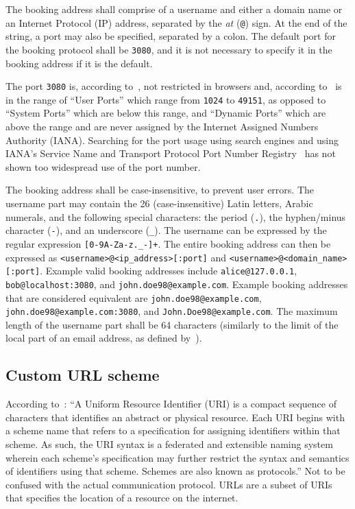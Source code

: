 The booking address shall comprise of a username and either a domain name or an Internet Protocol (IP) address, separated by the \textit{at} (\texttt{@}) sign. At the end of the string, a port may also be specified, separated by a colon. The default port for the booking protocol shall be \texttt{3080}, and it is not necessary to specify it in the booking address if it is the default.

The port \texttt{3080} is, according to~\cite{neo4j_ports}, not restricted in browsers and, according to~\cite{rfc6335} is in the range of \enquote{User Ports} which range from \texttt{1024} to \texttt{49151}, as opposed to \enquote{System Ports} which are below this range, and \enquote{Dynamic Ports} which are above the range and are never assigned by the Internet Assigned Numbers Authority (IANA). Searching for the port usage using search engines and using IANA's Service Name and Transport Protocol Port Number Registry~\cite{iana_ports} has not shown too widespread use of the port number.

\begin{sloppypar}
The booking address shall be case-insensitive, to prevent user errors. The username part may contain the 26 (case-insensitive) Latin letters, Arabic numerals, and the following special characters: the period (\texttt{.}), the hyphen/minus character (\texttt{-}), and an underscore (\texttt{_}). The username can be expressed by the regular expression \texttt{[0-9A-Za-z._-]+}. The entire booking address can then be expressed as \texttt{<username>@<ip_address>[:port]} and \texttt{<username>@<domain_name>[:port]}. Example valid booking addresses include \texttt{alice@127.0.0.1}, \texttt{bob@localhost:3080}, and \texttt{john.doe98@example.com}. Example booking addresses that are considered equivalent are \texttt{john.doe98@example.com}, \texttt{john.doe98@example.com:3080}, and \texttt{John.Doe98@example.com}. The maximum length of the username part shall be 64 characters (similarly to the limit of the local part of an email address, as defined by~\cite{rfc5321}).
\end{sloppypar}

\subsection{Custom URL scheme}

According to~\cite{google_pwa_uri}: \enquote{A Uniform Resource Identifier (URI) is a compact sequence of characters that identifies an abstract or physical resource. Each URI begins with a scheme name that refers to a specification for assigning identifiers within that scheme. As such, the URI syntax is a federated and extensible naming system wherein each scheme's specification may further restrict the syntax and semantics of identifiers using that scheme. Schemes are also known as protocols.} Not to be confused with the actual communication protocol. URLs are a subset of URIs that specifies the location of a resource on the internet.

